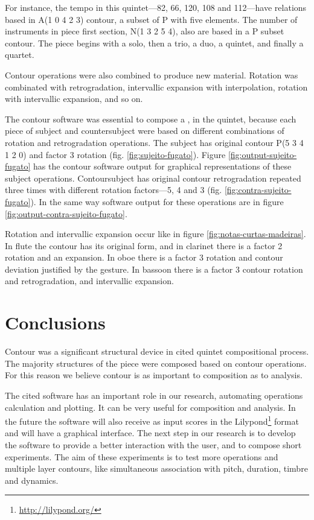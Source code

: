 For instance, the tempo in this quintet---82, 66, 120, 108 and
112---have relations based in A(1 0 4 2 3) contour, a subset of P with
five elements. The number of instruments in piece first section, N(1 3
2 5 4), also are based in a P subset contour. The piece begins with a
solo, then a trio, a duo, a quintet, and finally a quartet.

Contour operations were also combined to produce new
material. Rotation was combinated with retrogradation, intervallic
expansion with interpolation, rotation with intervallic expansion, and
so on.

The contour software was essential to compose a , in the
quintet, because each piece of subject and countersubject were based
on different combinations of rotation and retrogradation operations.
The subject has original contour P(5 3 4 1 2 0) and factor 3 rotation
(fig. \ref{fig:sujeito-fugato}). Figure
\ref{fig:output-sujeito-fugato} has the contour software output for
graphical representations of these subject operations. Contoursubject
has original contour retrogradation repeated three times with
different rotation factors---5, 4 and 3
(fig. \ref{fig:contra-sujeito-fugato}). In the same way software
output for these operations are in figure
\ref{fig:output-contra-sujeito-fugato}.

Rotation and intervallic expansion occur like in figure
\ref{fig:notas-curtas-madeiras}. In flute the contour has its original
form, and in clarinet there is a factor 2 rotation and an
expansion. In oboe there is a factor 3 rotation and contour deviation
justified by the gesture. In bassoon there is a factor 3 contour
rotation and retrogradation, and intervallic expansion.

\section{Conclusions}
\label{sec:conclusions}

Contour was a significant structural device in cited quintet
compositional process. The majority structures of the piece were
composed based on contour operations. For this reason we believe
contour is as important to composition as to analysis.

The cited software has an important role in our research, automating
operations calculation and plotting. It can be very useful for
composition and analysis. In the future the software will also receive
as input scores in the Lilypond\footnote{\url{http://lilypond.org/}}
format and will have a graphical interface. The next step in our
research is to develop the software to provide a better interaction
with the user, and to compose short experiments. The aim of these
experiments is to test more operations and multiple layer contours,
like simultaneous association with pitch, duration, timbre and
dynamics.

